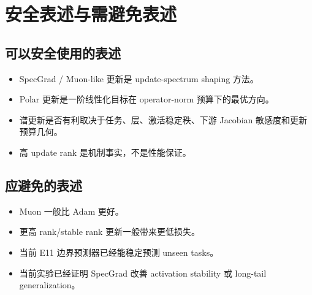 \section{安全表述与需避免表述}

\subsection{可以安全使用的表述}

\begin{itemize}
  \item SpecGrad / Muon-like 更新是 update-spectrum shaping 方法。
  \item Polar 更新是一阶线性化目标在 operator-norm 预算下的最优方向。
  \item 谱更新是否有利取决于任务、层、激活稳定秩、下游 Jacobian 敏感度和更新预算几何。
  \item 高 update rank 是机制事实，不是性能保证。
\end{itemize}

\subsection{应避免的表述}

\begin{itemize}
  \item Muon 一般比 Adam 更好。
  \item 更高 rank/stable rank 更新一般带来更低损失。
  \item 当前 E11 边界预测器已经能稳定预测 unseen tasks。
  \item 当前实验已经证明 SpecGrad 改善 activation stability 或 long-tail generalization。
\end{itemize}
